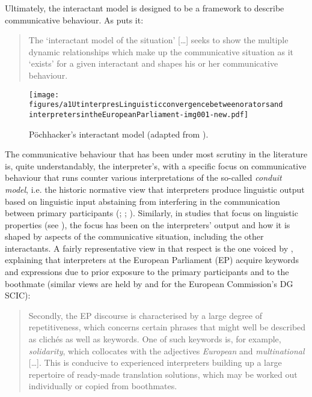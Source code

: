 \documentclass[output=paper]{langscibook}
\begin{document}
Ultimately, the interactant model is designed to be a framework to describe communicative behaviour. As \citet{Poechhacker2005} puts it:

\begin{quote}
The ‘interactant model of the situation’ [\ldots] seeks to show the multiple dynamic relationships which make up the communicative situation as it ‘exists’ for a given interactant and shapes his or her communicative behaviour. \citep[688]{Poechhacker2005}
\end{quote}

\begin{figure}

\texttt{[image: figures/a1UtinterpresLinguisticconvergencebetweenoratorsandinterpretersintheEuropeanParliament-img001-new.pdf]}
 

\caption{Pöchhacker’s interactant model (adapted from \citealt[689]{Poechhacker2005}).}
\label{fig:defrancq:1}
\end{figure}

The communicative behaviour that has been under most scrutiny in the literature is, quite understandably, the interpreter’s, with a specific focus on communicative behaviour that runs counter various interpretations of the so-called \textit{conduit model}, i.e. the historic normative view that interpreters produce linguistic output based on linguistic input abstaining from interfering in the communication between primary participants (\citealp{Diriker2004}; \citealp{Monacelli2009}; \citealp{Bartlomiejczyk2016}). Similarly, in studies that focus on linguistic properties (see ), the focus has been on the interpreters’ output and how it is shaped by aspects of the communicative situation, including the other interactants. A fairly representative view in that respect is the one voiced by \citet{Bartlomiejczyk2016}, explaining that interpreters at the European Parliament (EP) acquire keywords and expressions due to prior exposure to the primary participants and to the boothmate (similar views are held by \citealt{Duflou2016} and \citealt{Henriksen2007} for the European Commission’s DG SCIC):

\begin{quote}
Secondly, the EP discourse is characterised by a large degree of repetitiveness, which concerns certain phrases that might well be described as clichés as well as keywords. One of such keywords is, for example, \textit{solidarity}, which collocates with the adjectives \textit{European} and \textit{multinational} [\ldots]. This is conducive to experienced interpreters building up a large repertoire of ready-made translation solutions, which may be worked out individually or copied from boothmates. \citep[57]{Bartlomiejczyk2016}
\end{quote}
\end{document}
